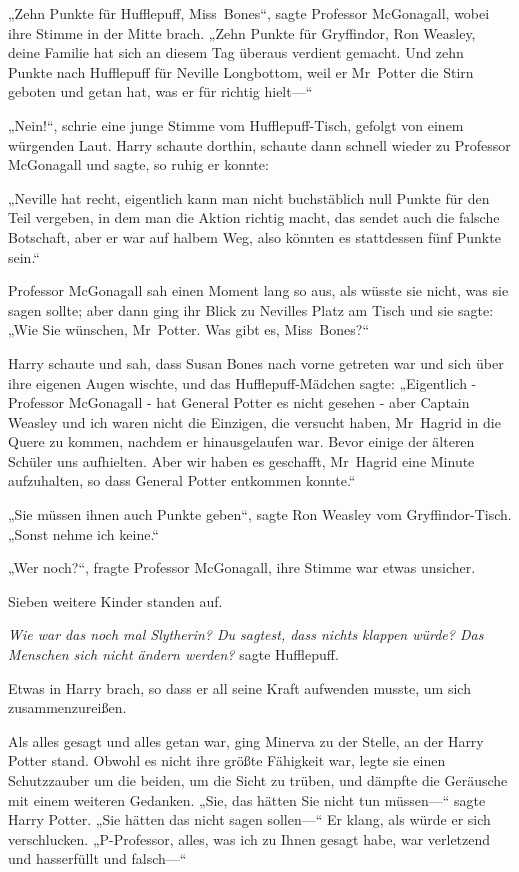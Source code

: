 {„Zehn Punkte für Hufflepuff, Miss~Bones“, sagte Professor McGonagall, wobei ihre Stimme in der Mitte brach. „Zehn Punkte für Gryffindor, Ron Weasley, deine Familie hat sich an diesem Tag überaus verdient gemacht. Und zehn Punkte nach Hufflepuff für Neville Longbottom, weil er Mr~Potter die Stirn geboten und getan hat, was er für richtig hielt—“

„Nein!“, schrie eine junge Stimme vom Hufflepuff-Tisch, gefolgt von einem würgenden Laut. Harry schaute dorthin, schaute dann schnell wieder zu Professor McGonagall und sagte, so ruhig er konnte:

„Neville hat recht, eigentlich kann man nicht buchstäblich null Punkte für den Teil vergeben, in dem man die Aktion richtig macht, das sendet auch die falsche Botschaft, aber er war auf halbem Weg, also könnten es stattdessen fünf Punkte sein.“

Professor McGonagall sah einen Moment lang so aus, als wüsste sie nicht, was sie sagen sollte; aber dann ging ihr Blick zu Nevilles Platz am Tisch und sie sagte: „Wie Sie wünschen, Mr~Potter. Was gibt es, Miss~Bones?“

Harry schaute und sah, dass Susan Bones nach vorne getreten war und sich über ihre eigenen Augen wischte, und das Hufflepuff-Mädchen sagte: „Eigentlich - Professor McGonagall - hat General Potter es nicht gesehen - aber Captain Weasley und ich waren nicht die Einzigen, die versucht haben, Mr~Hagrid in die Quere zu kommen, nachdem er hinausgelaufen war. Bevor einige der älteren Schüler uns aufhielten. Aber wir haben es geschafft, Mr~Hagrid eine Minute aufzuhalten, so dass General Potter entkommen konnte.“

„Sie müssen ihnen auch Punkte geben“, sagte Ron Weasley vom Gryffindor-Tisch. „Sonst nehme ich keine.“

„Wer noch?“, fragte Professor McGonagall, ihre Stimme war etwas unsicher.

Sieben weitere Kinder standen auf.

\emph{Wie war das noch mal Slytherin? Du sagtest, dass nichts klappen würde? Das Menschen sich nicht ändern werden?} sagte Hufflepuff.

Etwas in Harry brach, so dass er all seine Kraft aufwenden musste, um sich zusammenzureißen.

Als alles gesagt und alles getan war, ging Minerva zu der Stelle, an der Harry Potter stand. Obwohl es nicht ihre größte Fähigkeit war, legte sie einen Schutzzauber um die beiden, um die Sicht zu trüben, und dämpfte die Geräusche mit einem weiteren Gedanken. „Sie, das hätten Sie nicht tun müssen—“ sagte Harry Potter. „Sie hätten das nicht sagen sollen—“ Er klang, als würde er sich verschlucken. „P-Professor, alles, was ich zu Ihnen gesagt habe, war verletzend und hasserfüllt und falsch—“

}
